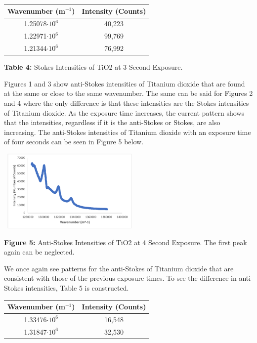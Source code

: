 \documentclass[12pt]{article}
\begin{document}
\begin{multicols}{2}
\newline
\begin{tabular}{|c|c|}
    \hline \textbf{Wavenumber (m$^{-1}$)} & \textbf{Intensity (Counts)} \\ \hline
    1.25078$\cdot10^6$ & 40,223 \\ \hline
    1.22971$\cdot10^6$ & 99,769 \\ \hline
    1.21344$\cdot10^6$ & 76,992 \\ \hline
\end{tabular}
\centerline{\tiny\textbf{{Table 4:}} \tiny{Stokes Intensities of TiO2 at 3 Second Exposure.}}
\newline
Figures 1 and 3 show anti-Stokes intensities of Titanium dioxide that are found at the same or close to the same wavenumber. The same can be said for Figures 2 and 4 where the only difference is that these intensities are the Stokes intensities of Titanium dioxide. As the exposure time increases, the current pattern shows that the intensities, regardless if it is the anti-Stokes or Stokes, are also increasing. The anti-Stokes intensities of Titanium dioxide with an exposure time of four seconds can be seen in Figure 5 below.
\begin{center}
    \includegraphics[width=7cm, height=4cm]{PHYS 331 RS TiO2 Antistokes Wavnumber (4 Sec).png}
    \caption{\textbf{\small{Figure 5:}} \small{Anti-Stokes Intensities of TiO2 at 4 Second Exposure. The first peak again can be neglected.}}
\end{center}
We once again see patterns for the anti-Stokes of Titanium dioxide that are consistent with those of the previous exposure times. To see the difference in anti-Stokes intensities, Table 5 is constructed.
\newline
\begin{tabular}{|c|c|}
    \hline \textbf{Wavenumber (m$^{-1}$)} & \textbf{Intensity (Counts)} \\ \hline
    1.33476$\cdot10^6$ & 16,548 \\ \hline
    1.31847$\cdot10^6$ & 32,530 \\ \hline

\end{tabular}
\end{multicols}
\end{document}
